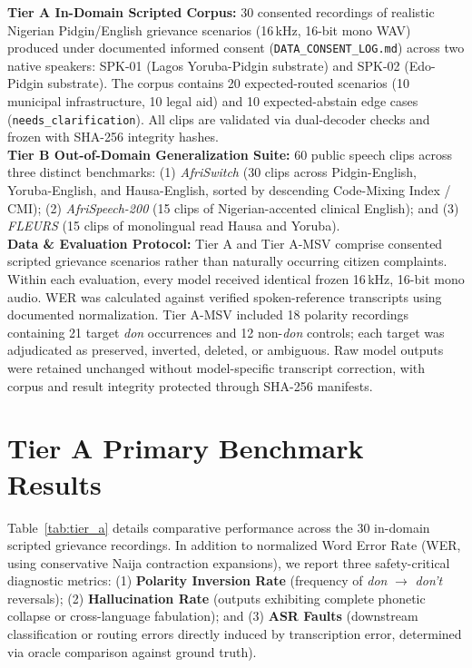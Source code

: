 \documentclass[9pt,a4paper]{extarticle}
\begin{document}
\textbf{Tier A In-Domain Scripted Corpus:} 30 consented recordings of realistic Nigerian Pidgin/English grievance scenarios (16\,kHz, 16-bit mono WAV) produced under documented informed consent (\texttt{DATA\_CONSENT\_LOG.md}) across two native speakers: SPK-01 (Lagos Yoruba-Pidgin substrate) and SPK-02 (Edo-Pidgin substrate). The corpus contains 20 expected-routed scenarios (10 municipal infrastructure, 10 legal aid) and 10 expected-abstain edge cases (\texttt{needs\_clarification}). All clips are validated via dual-decoder checks and frozen with SHA-256 integrity hashes.\\
\textbf{Tier B Out-of-Domain Generalization Suite:} 60 public speech clips across three distinct benchmarks: (1) \textit{AfriSwitch} (30 clips across Pidgin-English, Yoruba-English, and Hausa-English, sorted by descending Code-Mixing Index / CMI); (2) \textit{AfriSpeech-200} (15 clips of Nigerian-accented clinical English); and (3) \textit{FLEURS} (15 clips of monolingual read Hausa and Yoruba).\\
\textbf{Data \& Evaluation Protocol:} Tier A and Tier A-MSV comprise consented scripted grievance scenarios rather than naturally occurring citizen complaints. Within each evaluation, every model received identical frozen 16\,kHz, 16-bit mono audio. WER was calculated against verified spoken-reference transcripts using documented normalization. Tier A-MSV included 18 polarity recordings containing 21 target \textit{don} occurrences and 12 non-\textit{don} controls; each target was adjudicated as preserved, inverted, deleted, or ambiguous. Raw model outputs were retained unchanged without model-specific transcript correction, with corpus and result integrity protected through SHA-256 manifests.

\section{Tier A Primary Benchmark Results}
Table~\ref{tab:tier_a} details comparative performance across the 30 in-domain scripted grievance recordings. In addition to normalized Word Error Rate (WER, using conservative Naija contraction expansions), we report three safety-critical diagnostic metrics: (1) \textbf{Polarity Inversion Rate} (frequency of \textit{don} $\to$ \textit{don't} reversals); (2) \textbf{Hallucination Rate} (outputs exhibiting complete phonetic collapse or cross-language fabulation); and (3) \textbf{ASR Faults} (downstream classification or routing errors directly induced by transcription error, determined via oracle comparison against ground truth).
\end{document}
